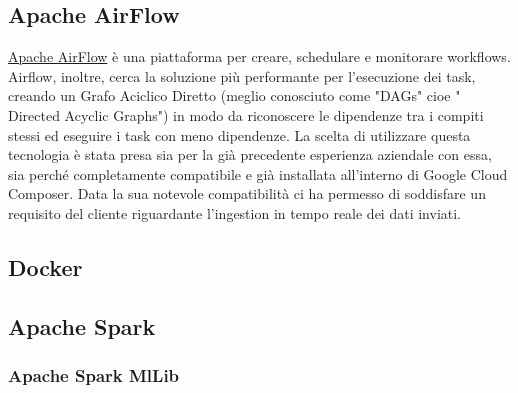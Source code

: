 \subsection{Apache AirFlow}
\href{https://airflow.apache.org/}{Apache AirFlow} è una piattaforma per creare, schedulare e monitorare \gls{workflows}. Airflow, inoltre, cerca la soluzione più performante per l'esecuzione dei task, creando un Grafo Aciclico Diretto (meglio conosciuto come "\gls{DAGs}" cioe " Directed Acyclic Graphs") in modo da riconoscere le dipendenze tra i compiti stessi ed eseguire i task con meno dipendenze.
La scelta di utilizzare questa tecnologia è stata presa sia per la già precedente esperienza aziendale con essa, sia perché completamente compatibile e già installata all'interno di Google Cloud Composer. Data la sua notevole compatibilità ci ha permesso di soddisfare un requisito del cliente riguardante l'ingestion in tempo reale dei dati inviati.
\subsection{Docker}
\subsection{Apache Spark}
\subsubsection{Apache Spark MlLib}
